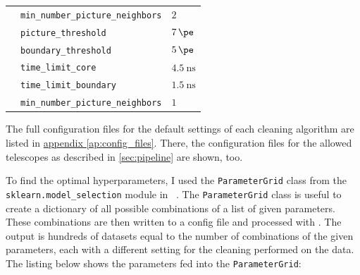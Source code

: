 \begin{table}
{\begin{tabular}{l l l}
                    & \texttt{min\_number\_picture\_neighbors}  & \qquad\(\num{2}\) \\
        \addlinespace[0.5em]
        \tcc{}      & \texttt{picture\_threshold}               & \qquad\(\SI{7}{\pe}\) \\
                    & \texttt{boundary\_threshold}              & \qquad\(\SI{5}{\pe}\) \\
                    & \texttt{time\_limit\_core}                & \qquad\(\SI{4.5}{\nano\second}\) \\
                    & \texttt{time\_limit\_boundary}            & \qquad\(\SI{1.5}{\nano\second}\) \\
                    & \texttt{min\_number\_picture\_neighbors}  & \qquad\(\num{1}\) \\
  \end{tabular}}
\end{table}
The full configuration files for the default settings of each cleaning algorithm are listed in
\hyperref[ap:config_files]{appendix \ref{ap:config_files}}. There, the configuration files for the allowed telescopes
as described in \autoref{sec:pipeline} are shown, too.

To find the optimal hyperparameters, I used the \texttt{ParameterGrid} class from the
\texttt{sklearn.model\_selection} module in \sklearn{}~\cite{scikit-learn}. The \texttt{ParameterGrid} class is useful to create a
dictionary of all possible combinations of a list of given parameters. These combinations are then
written to a config file and processed with \ctapipe{}. The output is hundreds of datasets equal to
the number of combinations of the given parameters, each with a different setting for the cleaning
performed on the data. The listing below shows the parameters fed into the \texttt{ParameterGrid}:
\begin{mdframed}[backgroundcolor=white!20!black,leftmargin=0cm,rightmargin=0cm, skipabove=0pt, innerleftmargin=0,innerrightmargin=0,]
\end{mdframed}

